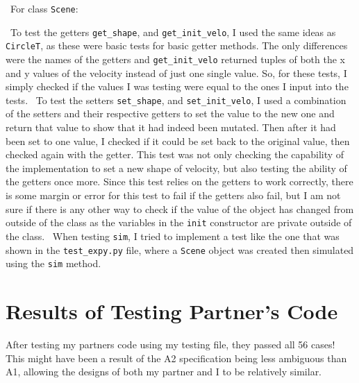 \documentclass[12pt]{article}
\begin{document}
~\newline\noindent For class \verb|Scene|:

~\newline\noindent To test the getters \verb|get_shape|, and \verb|get_init_velo|, I used the 
same ideas as \verb|CircleT|, as these were basic tests for basic getter methods. The only 
differences were the names of the getters and \verb|get_init_velo| returned tuples of both the x
and y values of the velocity instead of just one single value. So, for these tests, I simply 
checked if the values I was testing were equal to the ones I input into the tests. 
~\newline\noindent To test the setters \verb|set_shape|, and \verb|set_init_velo|, I used a 
combination of the setters and their respective getters to set the value to the new one and 
return that value to show that it had indeed been mutated. Then after it had been set to one 
value, I checked if it could be set back to the original value, then checked again with the 
getter. This test was not only checking the capability of the implementation to set a new shape 
of velocity, but also testing the ability of the getters once more. Since this test relies on the
getters to work correctly, there is some margin or error for this test to fail if the getters 
also fail, but I am not sure if there is any other way to check if the value of the object has 
changed from outside of the class as the variables in the \verb|init| constructor are private 
outside of the class. 
~\newline\noindent When testing \verb|sim|, I tried to implement a test like the one that was shown in the \verb|test_expy.py| file, where a \verb|Scene| object was created then simulated using the \verb|sim| method. 



\section{Results of Testing Partner's Code}

After testing my partners code using my testing file, they passed all 56 cases! This might have 
been a result of the A2 specification being less ambiguous than A1, allowing the designs of both 
my partner and I to be relatively similar.
\end{document}
